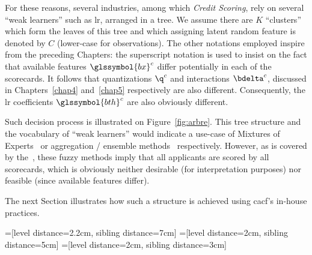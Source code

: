 For these reasons, several industries, among which \textit{Credit Scoring}, rely on several ``weak learners'' such as \gls{lr}, arranged in a tree. We assume there are $K$ ``clusters'' which form the leaves of this tree and which assigning latent random feature is denoted by $C$ (lower-case for observations). The other notations employed inspire from the preceding Chapters: the superscript notation is used to insist on the fact that available features $\glssymbol{bx}^c$ differ potentially in each of the scorecards. It follows that quantizations $\q^c$ and interactions $\bdelta^c$, discussed in Chapters~\ref{chap4} and~\ref{chap5} respectively are also different. Consequently, the \gls{lr} coefficients $\glssymbol{bth}^c$ are also obviously different.

Such decision process is illustrated on Figure~\ref{fig:arbre}. This tree structure and the vocabulary of ``weak learners'' would indicate a use-case of Mixtures of Experts~\cite{jordan1994hierarchical} or aggregation / ensemble methods~\cite{opitz1999popular} respectively. However, as is covered by the~, these fuzzy methods imply that all applicants are scored by all scorecards, which is obviously neither desirable (for interpretation purposes) nor feasible (since available features differ).

The next Section illustrates how such a structure is achieved using \gls{cacf}'s in-house practices.

=[level distance=2.2cm, sibling distance=7cm]
=[level distance=2cm, sibling distance=5cm]
=[level distance=2cm, sibling distance=3cm]

